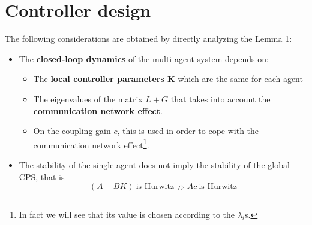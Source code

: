 \section{Controller design}
\noindent
The following considerations are obtained by directly analyzing the Lemma 1:
\begin{itemize}
    \itemsep0em
    \item The \textbf{closed-loop dynamics} of the multi-agent system depends on:
    \begin{itemize}
        \item The \textbf{local controller parameters K} which are the same for each agent
         \item The eigenvalues of the matrix $L+G$ that takes into account the \textbf{communication network effect}.
        \item On the coupling gain $c$, this is used in order to cope with the communication network effect{\footnote[8]{
            In fact we will see that its value is chosen according to the $\lambda_i$s.
        }}.
    \end{itemize}
    \item The stability of the single agent does not imply the stability of the global CPS, that is
    \begin{equation*}
        (A-BK) \ \text{is Hurwitz} \nRightarrow Ac \ \text{is Hurwitz}
    \end{equation*}
\end{itemize}

\hspace*{-5mm}
%

